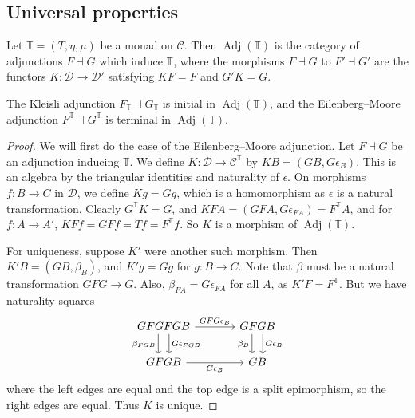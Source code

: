 \subsection{Universal properties}
\begin{definition}
    Let \( \mathbb T = (T, \eta, \mu) \) be a monad on \( \mathcal C \).
    Then \( \operatorname{Adj}(\mathbb T) \) is the category of adjunctions \( F \dashv G \) which induce \( \mathbb T \), where the morphisms \( F \dashv G \) to \( F' \dashv G' \) are the functors \( K : \mathcal D \to \mathcal D' \) satisfying \( KF = F \) and \( G' K = G \).
\end{definition}
\begin{theorem}
    The Kleisli adjunction \( F_{\mathbb T} \dashv G_{\mathbb T} \) is initial in \( \operatorname{Adj}(\mathbb T) \), and the Eilenberg--Moore adjunction \( F^{\mathbb T} \dashv G^{\mathbb T} \) is terminal in \( \operatorname{Adj}(\mathbb T) \).
\end{theorem}
\begin{proof}
    We will first do the case of the Eilenberg--Moore adjunction.
    Let \( F \dashv G \) be an adjunction inducing \( \mathbb T \).
    We define \( K : \mathcal D \to \mathcal C^{\mathbb T} \) by \( KB = (GB, G\epsilon_B) \).
    This is an algebra by the triangular identities and naturality of \( \epsilon \).
    On morphisms \( f : B \to C \) in \( \mathcal D \), we define \( Kg = Gg \), which is a homomorphism as \( \epsilon \) is a natural transformation.
    Clearly \( G^{\mathbb T}K = G \), and \( KFA = (GFA, G\epsilon_{FA}) = F^{\mathbb T}A \), and for \( f : A \to A' \), \( KFf = GFf = Tf = F^{\mathbb T} f \).
    So \( K \) is a morphism of \( \operatorname{Adj}(\mathbb T) \).

    For uniqueness, suppose \( K' \) were another such morphism.
    Then \( K'B = (GB, \beta_B) \), and \( K'g = Gg \) for \( g : B \to C \).
    Note that \( \beta \) must be a natural transformation \( GFG \to G \).
    Also, \( \beta_{FA} = G\epsilon_{FA} \) for all \( A \), as \( K'F = F^{\mathbb T} \).
    But we have naturality squares
\[\begin{tikzcd}[column sep=large]
	GFGFGB & GFGB \\
	GFGB & GB
	\arrow["{\beta_{FGB}}"', shift right=2, from=1-1, to=2-1]
	\arrow["{GFG\epsilon_B}", from=1-1, to=1-2]
	\arrow["{G\epsilon_B}"', from=2-1, to=2-2]
	\arrow["{G\epsilon_{FGB}}", shift left=2, from=1-1, to=2-1]
	\arrow["{\beta_B}"', shift right=2, from=1-2, to=2-2]
	\arrow["{G\epsilon_B}", shift left=2, from=1-2, to=2-2]
\end{tikzcd}\]
    where the left edges are equal and the top edge is a split epimorphism, so the right edges are equal.
    Thus \( K \) is unique.
\end{proof}
